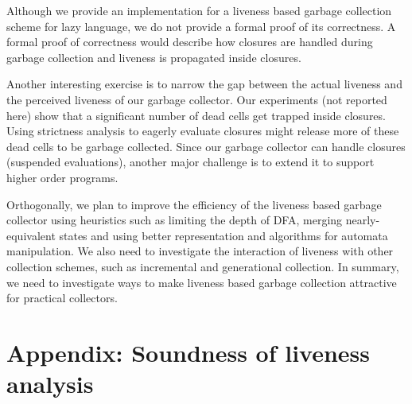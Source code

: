 \documentclass[preprint,9pt]{sigplanconf}
\begin{document}
Although we  provide an  implementation for  a liveness
based garbage  collection scheme for lazy  language, we
do not  provide a formal  proof of its  correctness.  A
formal proof of correctness would describe how closures
are handled  during garbage collection and  liveness is
propagated inside closures.

  Another  interesting exercise  is to  narrow the  gap
  between  the   actual  liveness  and   the  perceived
  liveness  of our  garbage collector.  Our experiments
  (not reported here) show that a significant number of
  dead  cells  get   trapped  inside  closures.   Using
  strictness  analysis  to  eagerly  evaluate  closures
  might release more of these  dead cells to be garbage
  collected.   Since our  garbage collector  can handle
  closures   (suspended  evaluations),   another  major
  challenge  is to  extend it  to support  higher order
  programs.

  Orthogonally, we  plan to  improve the  efficiency of
  the liveness based garbage collector using heuristics
  such   as  limiting   the  depth   of  DFA,   merging
  nearly-equivalent    states    and    using    better
  representation    and    algorithms   for    automata
  manipulation.  We   also  need  to   investigate  the
  interaction   of  liveness   with  other   collection
  schemes,   such  as   incremental  and   generational
  collection.  In summary, we  need to investigate ways
  to make liveness  based garbage collection attractive
  for practical collectors.


{}


\clearpage
\section{Appendix: Soundness of liveness analysis}
 
\end{document}
